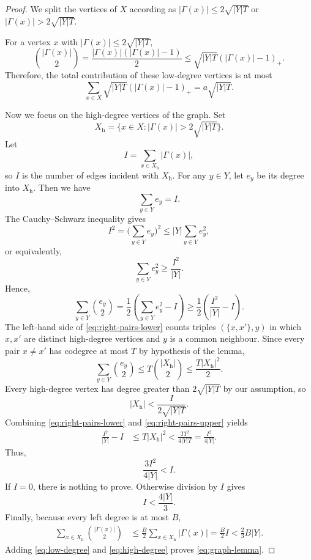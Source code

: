 \documentclass[12pt,a4paper,reqno]{amsart}
\numberwithin{equation}{section}
\theoremstyle{plain}
\theoremstyle{definition}
\begin{document}
\begin{proof}
We split the vertices of \(X\) according as \(|\Gamma(x)|\le 2\sqrt{|Y|T}\) or \(|\Gamma(x)|>2\sqrt{|Y|T}\).

For a vertex $x$ with \(|\Gamma(x)|\le 2\sqrt{|Y|T}\),
\[
 \binom{|\Gamma(x)|}2
 =\frac{|\Gamma(x)|(|\Gamma(x)|-1)}2
 \le\sqrt{|Y|T}(|\Gamma(x)|-1)_+.
\]
Therefore, the total contribution of these low-degree vertices is at most
\begin{equation}\label{eq:low-degree}
 \sum_{x\in X}\sqrt{|Y|T}(|\Gamma(x)|-1)_+=a\sqrt{|Y|T}.
 \end{equation}

Now we focus on the high-degree vertices of the graph. Set
\[
 X_{\mathrm{h}}=\big\{x\in X:|\Gamma(x)|>2\sqrt{|Y|T}\big\}.
\]
Let
\[
 I=\sum_{x\in X_{\mathrm{h}}}|\Gamma(x)|,
\]
so \(I\) is the number of edges incident with \(X_{\mathrm{h}}\).  For any \(y\in Y\), let \(e_y\) be its degree into \(X_{\mathrm{h}}\).  Then we have
\[
 \sum_{y\in Y}e_y=I.
\]
The Cauchy--Schwarz inequality gives
$$
I^2=\Big(\sum_{y\in Y}e_y\Big)^2\le |Y|\sum_{y\in Y}e_y^2,
$$
or equivalently,
\[
 \sum_{y\in Y}e_y^2\ge\frac{I^2}{|Y|}.
\]
Hence,
\begin{equation}\label{eq:right-pairs-lower}
 \sum_{y\in Y}\binom{e_y}{2}
 =\frac12\left(\sum_{y\in Y}e_y^2-I\right)
 \ge\frac12\left(\frac{I^2}{|Y|}-I\right).
\end{equation}
The left-hand side of \eqref{eq:right-pairs-lower} counts triples \((\{x,x'\},y)\) in which \(x,x'\) are distinct high-degree vertices and \(y\) is a common neighbour.  Since every pair \(x\ne x'\) has codegree at most \(T\) by hypothesis of the lemma,
\begin{equation}\label{eq:right-pairs-upper}
 \sum_{y\in Y}\binom{e_y}{2}
 \le T\binom {|X_{\mathrm{h}}|}2
 \le\frac{T|X_{\mathrm{h}}|^2}{2}.
\end{equation}
Every high-degree vertex has degree greater than \(2\sqrt{|Y|T}\) by our assumption, so
\[
 |X_{\mathrm{h}}|<\frac{I}{2\sqrt{|Y|T}}.
\]
Combining \eqref{eq:right-pairs-lower} and \eqref{eq:right-pairs-upper} yields
\begin{align*}
 \frac{I^2}{|Y|}-I
 &\le T|X_{\mathrm{h}}|^2
 <\frac{TI^2}{4|Y|T}
 =\frac{I^2}{4|Y|}.
\end{align*}
Thus,
\[
 \frac{3I^2}{4|Y|}<I.
\]
If \(I=0\), there is nothing to prove.  Otherwise division by \(I\) gives
\begin{equation*}
 I<\frac{4|Y|}{3}.
\end{equation*}
Finally, because every left degree is at most \(B\),
\begin{align}
 \sum_{x\in X_{\mathrm{h}}}\binom{|\Gamma(x)|}2
 &\le\frac B2\sum_{x\in X_{\mathrm{h}}}|\Gamma(x)|
 =\frac B2I
 <\frac23B|Y|.
 \label{eq:high-degree}
\end{align}
Adding \eqref{eq:low-degree} and \eqref{eq:high-degree} proves \eqref{eq:graph-lemma}.
\end{proof}
\end{document}
